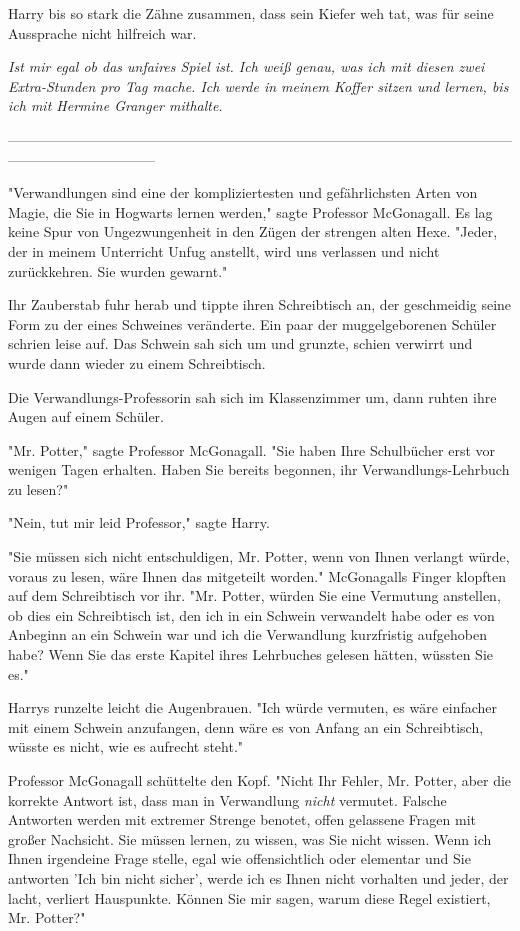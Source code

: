 {Harry bis so stark die Zähne zusammen, dass sein Kiefer weh tat, was für seine Aussprache nicht hilfreich war.

\emph{Ist mir egal ob das unfaires Spiel ist. Ich weiß genau, was ich mit diesen zwei Extra-Stunden pro Tag mache. Ich werde in meinem Koffer sitzen und lernen, bis ich mit Hermine Granger mithalte.}

--------------------------------------------------------------------------------------------------------------------------------------------

"Verwandlungen sind eine der kompliziertesten und gefährlichsten Arten von Magie, die Sie in Hogwarts lernen werden," sagte Professor McGonagall. Es lag keine Spur von Ungezwungenheit in den Zügen der strengen alten Hexe. "Jeder, der in meinem Unterricht Unfug anstellt, wird uns verlassen und nicht zurückkehren. Sie wurden gewarnt."

Ihr Zauberstab fuhr herab und tippte ihren Schreibtisch an, der geschmeidig seine Form zu der eines Schweines veränderte. Ein paar der muggelgeborenen Schüler schrien leise auf. Das Schwein sah sich um und grunzte, schien verwirrt und wurde dann wieder zu einem Schreibtisch.

Die Verwandlungs-Professorin sah sich im Klassenzimmer um, dann ruhten ihre Augen auf einem Schüler.

"Mr. Potter," sagte Professor McGonagall. "Sie haben Ihre Schulbücher erst vor wenigen Tagen erhalten. Haben Sie bereits begonnen, ihr Verwandlungs-Lehrbuch zu lesen?"

"Nein, tut mir leid Professor," sagte Harry.

"Sie müssen sich nicht entschuldigen, Mr. Potter, wenn von Ihnen verlangt würde, voraus zu lesen, wäre Ihnen das mitgeteilt worden." McGonagalls Finger klopften auf dem Schreibtisch vor ihr. "Mr. Potter, würden Sie eine Vermutung anstellen, ob dies ein Schreibtisch ist, den ich in ein Schwein verwandelt habe oder es von Anbeginn an ein Schwein war und ich die Verwandlung kurzfristig aufgehoben habe? Wenn Sie das erste Kapitel ihres Lehrbuches gelesen hätten, wüssten Sie es."

Harrys runzelte leicht die Augenbrauen. "Ich würde vermuten, es wäre einfacher mit einem Schwein anzufangen, denn wäre es von Anfang an ein Schreibtisch, wüsste es nicht, wie es aufrecht steht."

Professor McGonagall schüttelte den Kopf. "Nicht Ihr Fehler, Mr. Potter, aber die korrekte Antwort ist, dass man in Verwandlung \emph{nicht} vermutet. Falsche Antworten werden mit extremer Strenge benotet, offen gelassene Fragen mit großer Nachsicht. Sie müssen lernen, zu wissen, was Sie nicht wissen. Wenn ich Ihnen irgendeine Frage stelle, egal wie offensichtlich oder elementar und Sie antworten 'Ich bin nicht sicher', werde ich es Ihnen nicht vorhalten und jeder, der lacht, verliert Hauspunkte. Können Sie mir sagen, warum diese Regel existiert, Mr. Potter?"

}
